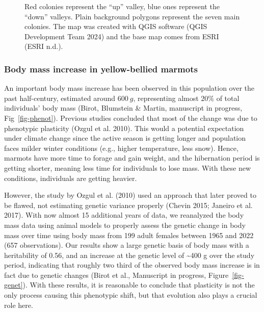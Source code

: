 \documentclass[
  12pt,
  letterpaper,
]{scrartcl}
\makeatletter
\newcommand*\pandocbounded[1]{%
  \sbox\pandoc@box{#1}%
  \Gscale@div\@tempa{\textheight}{\dimexpr\ht\pandoc@box+\dp\pandoc@box\relax}%
  \Gscale@div\@tempb{\linewidth}{\wd\pandoc@box}%
  \ifdim\@tempb\p@<\@tempa\p@\let\@tempa\@tempb\fi%
  \ifdim\@tempa\p@<\p@\scalebox{\@tempa}{\usebox\pandoc@box}%
  \else\usebox{\pandoc@box}%
  \fi%
}
\makeatother
\begin{document}
\begin{figure}

\centering{

\pandocbounded{\texttt{[image: figures/map\_study\_site.png]}}

}

\caption{\label{fig-map-study-site}Red colonies represent the ``up''
valley, blue ones represent the ``down'' valleys. Plain background
polygons represent the seven main colonies. The map was created with
QGIS software (QGIS Development Team 2024) and the base map comes from
ESRI (ESRI n.d.).}

\end{figure}%

\subsubsection{Body mass increase in yellow-bellied
marmots}\label{body-mass-increase-in-yellow-bellied-marmots}

An important body mass increase has been observed in this population
over the past half-century, estimated around \(600\ g\), representing
almost \(20\%\) of total individuals' body mass (Birot, Blumstein \&
Martin, manuscript in progress, Fig~\ref{fig-phenot}). Previous studies
concluded that most of the change was due to phenotypic plasticity
(Ozgul et al. 2010). This would a potential expectation under climate
change since the active season is getting longer and population faces
milder winter conditions (e.g., higher temperature, less snow). Hence,
marmots have more time to forage and gain weight, and the hibernation
period is getting shorter, meaning less time for individuals to lose
mass. With these new conditions, individuals are getting heavier.

However, the study by Ozgul et al. (2010) used an approach that later
proved to be flawed, not estimating genetic variance properly (Chevin
2015; Janeiro et al. 2017). With now almost 15 additional years of data,
we reanalyzed the body mass data using animal models to properly assess
the genetic change in body mass over time using body mass from 199 adult
females between 1965 and 2022 (657 observations). Our results show a
large genetic basis of body mass with a heritability of 0.56, and an
increase at the genetic level of \textasciitilde400 g over the study
period, indicating that roughly two third of the observed body mass
increase is in fact due to genetic changes (Birot et al., Manuscript in
progress, Figure~\ref{fig-genet}). With these results, it is reasonable
to conclude that plasticity is not the only process causing this
phenotypic shift, but that evolution also plays a crucial role here.
\end{document}
